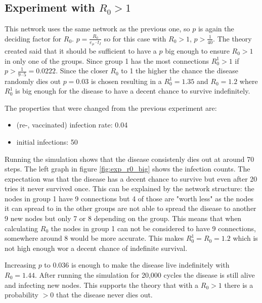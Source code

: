 \subsection{Experiment with $R_0 > 1$}
This network uses the same network as the previous one, so $p$ is again the deciding factor for $R_0$. $p = \frac{R_0}{e_\mu \cdot t_I}$ so for this case with $R_0 > 1$, $p > \frac{1}{40}$. The theory created said that it should be sufficient to have a $p$ big enough to ensure $R_0 > 1$ in only one of the groups. Since group 1 has the most connections $R_0^1 > 1$ if $p > \frac{1}{9\cdot5} = 0.0222$. Since the closer $R_0$ to 1 the higher the chance the disease randomly dies out $p=0.03$ is chosen resulting in a $R_0^1 = 1.35$ and $R_0 = 1.2$ where $R_0^1$ is big enough for the disease to have a decent chance to survive indefinitely.

The properties that were changed from the previous experiment are:
\begin{itemize}
    \item (re-, vaccinated) infection rate: 0.04
    \item initial infections: 50
\end{itemize}

Running the simulation shows that the disease consistenly dies out at around 70 steps. The left graph in figure \ref{fig:exp_r0_big} shows the infection counts. The expectation was that the disease has a decent chance to survive but even after 20 tries it never survived once. This can be explained by the network structure: the nodes in group 1 have 9 connections but 4 of those are "worth less" as the nodes it can spread to in the other groups are not able to spread the disease to another 9 new nodes but only 7 or 8 depending on the group. This means that when calculating $R_0$ the nodes in group 1 can not be considered to have 9 connections, somewhere around 8 would be more accurate. This makes $R_0^1 = R_0 = 1.2$ which is not high enough wor a decent chance of indefinite survival.

Increasing $p$ to 0.036 is enough to make the disease live indefinitely with $R_0 = 1.44$. After running the simulation for 20,000 cycles the disease is still alive and infecting new nodes. This supports the theory that with a $R_0 > 1$ there is a probability $> 0$ that the disease never dies out. 


